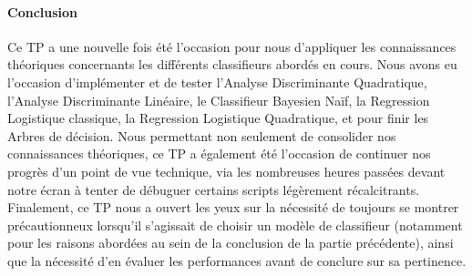 \documentclass{report}
\begin{document}
\paragraph{Conclusion}
Ce TP a une nouvelle fois été l'occasion pour nous d'appliquer les connaissances théoriques concernants les différents classifieurs abordés en cours. Nous avons eu l'occasion d'implémenter et de tester l'Analyse Discriminante Quadratique, l'Analyse Discriminante Linéaire, le Classifieur Bayesien Naïf, la Regression Logistique classique, la Regression Logistique Quadratique, et pour finir les Arbres de décision. Nous permettant non seulement de consolider nos connaissances théoriques, ce TP a également été l'occasion de continuer nos progrès d'un point de vue technique, via les nombreuses heures passées devant notre écran à tenter de débuguer certains scripts légèrement récalcitrants. Finalement, ce TP nous a ouvert les yeux sur la nécessité de toujours se montrer précautionneux lorsqu'il s'agissait de choisir un modèle de classifieur (notamment pour les raisons abordées au sein de la conclusion de la partie précédente), ainsi que la nécessité d'en évaluer les performances avant de conclure sur sa pertinence.
\end{document}
